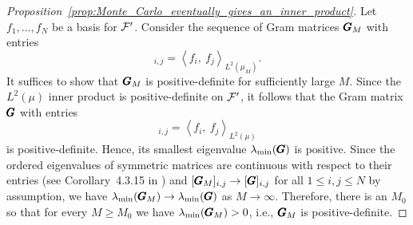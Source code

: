\documentclass[twoside,11pt]{article}
\begin{document}
\begin{proof}[Proposition~\ref{prop:Monte_Carlo_eventually_gives_an_inner_product}]
    \label{proof:Monte_Carlo_eventually_gives_an_inner_product}
    Let $f_1, \ldots, f_N$ be a basis for ${\mathcal{F}}'$.
    Consider the sequence of Gram matrices ${\pmb{G}}_M$ with entries
    \begin{equation}
        [\mat{G}_M]_{i,j} = \left\langle f_i, \ f_j \right\rangle_{L^2(\mu_M)}.
    \end{equation}
    It suffices to show that ${\pmb{G}}_M$ is positive-definite for sufficiently large $M$.
    Since the $L^2(\mu)$ inner product is positive-definite on ${\mathcal{F}}'$, it follows that the Gram matrix ${\pmb{G}}$ with entries
    \begin{equation}
        [\mat{G}]_{i,j} = \left\langle f_i, \ f_j \right\rangle_{L^2(\mu)}
    \end{equation}
    is positive-definite.
    Hence, its smallest eigenvalue $\lambda_{\text{min}}({\pmb{G}})$ is positive.
    Since the ordered eigenvalues of symmetric matrices are continuous with respect to their entries (see Corollary~4.3.15 in \cite{Horn2013matrix}) and $[{\pmb{G}}_M]_{i,j} \to [{\pmb{G}}]_{i,j}$ for all $1\leq i,j\leq N$ by assumption, we have $\lambda_{\text{min}}({\pmb{G}}_M) \to \lambda_{\text{min}}({\pmb{G}})$ as $M\to\infty$.
    Therefore, there is an $M_0$ so that for every $M \geq M_0$ we have $\lambda_{\text{min}}({\pmb{G}}_M) > 0$, i.e., ${\pmb{G}}_M$ is positive-definite.
\end{proof}
\end{document}
